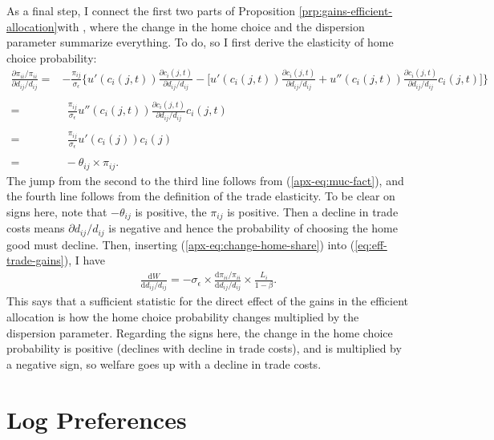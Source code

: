\documentclass[12pt,pdftex]{article}
\begin{document}
\begin{onehalfspacing}
As a final step, I connect the first two parts of Proposition \ref{prp:gains-efficient-allocation}with \citet{arkolakis2012new}, where the change in the home choice and the dispersion parameter summarize everything. To do, so I first derive the elasticity of home choice probability:
\begin{align}
\frac{\partial \pi_{ii} / \pi_{ii}}{\partial d_{ij} / d_{ij}} =& -\frac{\pi_{ij}}{\sigma_{\epsilon}} \bigg \{ u'(c_{i}(j,t))\frac{\partial c_{i}(j,t)}{\partial d_{ij} / d_{ij}} - \bigg [u'(c_{i}(j,t))\frac{\partial c_{i}(j,t)}{\partial d_{ij} / d_{ij}} + u''(c_{i}(j,t))\frac{\partial c_{i}(j,t)}{\partial d_{ij} / d_{ij}}c_{i}(j,t) \bigg ] \bigg \} \\
\nonumber \\
=& \ \ \frac{\pi_{ij}}{\sigma_{\epsilon}}u''(c_{i}(j,t))\frac{\partial c_{i}(j,t)}{\partial d_{ij} / d_{ij}}c_{i}(j,t) \\
\nonumber \\
=& \ \ \frac{\pi_{ij}}{\sigma_{\epsilon}} u'(c_{i}(j)) c_{i}(j) \\
\nonumber \\
=& \ - \theta_{ij} \times \pi_{ij}. \label{apx-eq:change-home-share}
\end{align}
The jump from the second to the third line follows from (\ref{apx-eq:muc-fact}), and the fourth line follows from the definition of the trade elasticity. To be clear on signs here, note that $-\theta_{ij}$ is positive, the $\pi_{ij}$ is positive. Then a decline in trade costs means $\partial d_{ij} / d_{ij}$ is negative and hence the probability of choosing the home good must decline.  Then, inserting (\ref{apx-eq:change-home-share}) into  (\ref{eq:eff-trade-gains}), I have
\begin{align}
\frac{\mathrm{d} W}{\mathrm{d} d_{ij} / d_{ij}} =  -\sigma_{\epsilon} \times \frac{\mathrm{d} \pi_{ii} / \pi_{ii}}{\mathrm{d} d_{ij} / d_{ij}} \times \frac{L_i}{1 - \beta}.
\label{apx-eq:eff-trade-gains-acr}
\end{align}
This says that a sufficient statistic for the direct effect of the gains in the efficient allocation is how the home choice probability changes multiplied by the dispersion parameter. Regarding the signs here, the change in the home choice probability is positive (declines with decline in trade costs), and is multiplied by a negative sign, so welfare goes up with a decline in trade costs.

\section{Log Preferences}\label{apx-sec:log-preferences}


\end{onehalfspacing}
\end{document}
